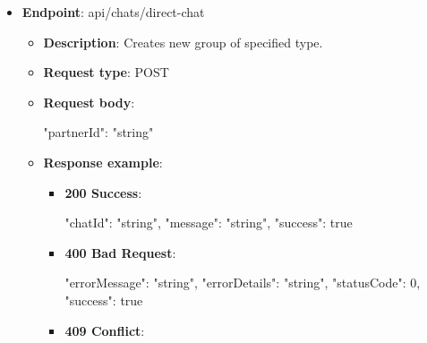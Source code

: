 \begin{itemize}
\begin{itemize}
\begin{itemize}
            \begin{spverbatim}
            {
                "errorMessage": "string",
                "errorDetails": "string",
                "statusCode": 0,
                "success": true
            }
            \end{spverbatim}
        \end{itemize}
        \item \textbf{Response messages}:
        \begin{enumerate}
            \item Success.
            \item User not found.
        \end{enumerate}
    \end{itemize}

    \item \textbf{Endpoint}: api/chats/direct-chat
    \begin{itemize}
        \item \textbf{Description}: Creates new group of specified type.
        \item \textbf{Request type}: POST
        \item \textbf{Request body}:
        \begin{spverbatim}
        {
            "partnerId": "string"
        }
        \end{spverbatim}
        \item \textbf{Response example}:
        \begin{itemize}
            \item \textbf{200 Success}:

            \begin{spverbatim}
            {
                "chatId": "string",
                "message": "string",
                "success": true
            }
            \end{spverbatim}

            \item \textbf{400 Bad Request}:

            \begin{spverbatim}
            {
                "errorMessage": "string",
                "errorDetails": "string",
                "statusCode": 0,
                "success": true
            }
            \end{spverbatim}

            \item \textbf{409 Conflict}:


\end{itemize}
\end{itemize}
\end{itemize}
